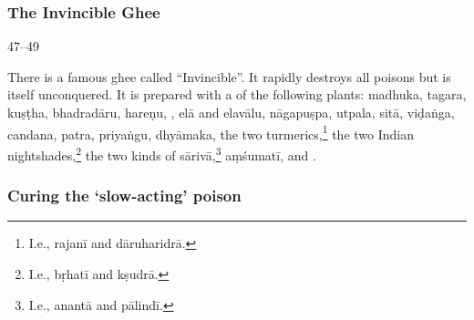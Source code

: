 \subsubsection{The Invincible Ghee}
    
  \begin{translation}
    
    \item[47--49]
    
    \label{ajeya} There is a famous ghee called “Invincible”. 
    It rapidly destroys all poisons but is itself unconquered. It is prepared with a
 of the following plants: %
\gls{madhuka},
\gls{tagara},
\gls{kuṣṭha},
\gls{bhadradāru},
\gls{hareṇu},
,
\gls{elā}
and \gls{elavālu},
\gls{nāgapuṣpa},
\gls{utpala},
\gls{sitā},
\gls{viḍaṅga},
\gls{candana},
\gls{patra},
\gls{priyaṅgu},
\gls{dhyāmaka},
the two turmerics,\footnote{I.e., \gls{rajanī} and \gls{dāruharidrā}.}
the two Indian nightshades,\footnote{I.e., \gls{bṛhatī} and \gls{kṣudrā}.}
the two kinds of \gls{sārivā},\footnote{I.e., \gls{anantā} and \gls{pālindī}.}
\gls{aṃśumatī},
and 
.
    
    \end{translation}

\subsubsection{Curing the `slow-acting' poison}
    

